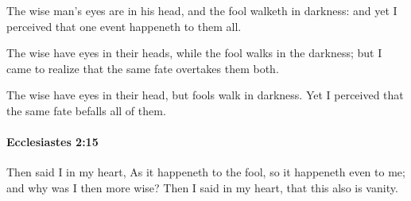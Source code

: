 			\begin{versebox}
					\item[BHS] 
					\item[LXX] 
					\item[ASV] The wise man's eyes are in his head, and the fool walketh in darkness: and yet I perceived that one event happeneth to them all.
					\item[NIV] The wise have eyes in their heads, while the fool walks in the darkness; but I came to realize that the same fate overtakes them both.
					\item[NRSV] The wise have eyes in their head, but fools walk in darkness. Yet I perceived that the same fate befalls all of them.
			\end{versebox}

		\paragraph{Ecclesiastes 2:15} %
			\label{ECCLESIASTES-2-15}

			Then said I in my heart, As it happeneth to the fool, so it happeneth even to me; and why was I then more wise? Then I said in my heart, that this also is vanity.

